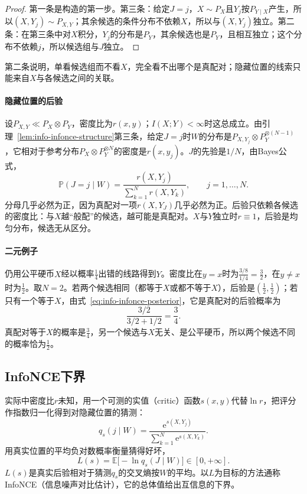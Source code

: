 \begin{proof}
第一条是构造的第一步。第三条：给定$J=j$，$X\sim P_X$且$Y_j$按$P_{Y\mid X}$产生，所以$(X,Y_j)\sim P_{X,Y}$；其余候选的条件分布不依赖$X$，所以与$(X,Y_j)$独立。第二条：在第三条中对$X$积分，$Y_j$的分布是$P_Y$，其余候选也是$P_Y$，且相互独立；这个分布不依赖$j$，所以候选组与$J$独立。
\end{proof}

第二条说明，单看候选组而不看$X$，完全看不出哪个是真配对；隐藏位置的线索只能来自$X$与各候选之间的关联。

\paragraph{隐藏位置的后验}
设$P_{X,Y}\ll P_X\otimes P_Y$，密度比为$r(x,y)$；$I(X;Y)<\infty$时这总成立。由引理~\ref{lem:info-infonce-structure}第三条，给定$J=j$时$W$的分布是$P_{X,Y_j}\otimes P_Y^{\otimes(N-1)}$，它相对于参考分布$P_X\otimes P_Y^{\otimes N}$的密度是$r(x,y_j)$。$J$的先验是$1/N$，由Bayes公式，
\begin{equation}
  \mathbb{P}(J=j\mid W)=\frac{r(X,Y_j)}{\sum_{k=1}^{N}r(X,Y_k)},\qquad j=1,\dots,N.
  \label{eq:info-infonce-posterior}
\end{equation}
分母几乎必然为正，因为真配对一项$r(X,Y_J)$几乎必然为正。后验只依赖各候选的密度比：与$X$越“般配”的候选，越可能是真配对。$X$与$Y$独立时$r\equiv1$，后验是均匀分布，候选无从区分。

\paragraph{二元例子}
仍用公平硬币$X$经以概率$\tfrac14$出错的线路得到$Y$。密度比在$y=x$时为$\tfrac{3/8}{1/4}=\tfrac32$，在$y\neq x$时为$\tfrac12$。取$N=2$。若两个候选相同（都等于$X$或都不等于$X$），后验是$(\tfrac12,\tfrac12)$；若只有一个等于$X$，由式~\eqref{eq:info-infonce-posterior}，它是真配对的后验概率为
\[
  \frac{3/2}{3/2+1/2}=\frac34.
\]
真配对等于$X$的概率是$\tfrac34$，另一个候选与$X$无关、是公平硬币，所以两个候选不同的概率恰为$\tfrac12$。

\subsection{InfoNCE下界}
\label{sec:info-infonce-bound}

实际中密度比$r$未知，用一个可测的实值（critic）函数$s(x,y)$代替$\ln r$，把评分作指数归一化得到对隐藏位置的猜测：
\begin{equation}
  q_s(j\mid W)=\frac{\mathrm{e}^{s(X,Y_j)}}{\sum_{k=1}^{N}\mathrm{e}^{s(X,Y_k)}}.
  \label{eq:info-infonce-softmax}
\end{equation}
用真实位置的平均负对数概率衡量猜得好坏，
\begin{equation}
  L(s)=\mathbb{E}\bigl[-\ln q_s(J\mid W)\bigr]\in[0,+\infty].
  \label{eq:info-infonce-loss}
\end{equation}
$L(s)$是真实后验相对于猜测$q_s$的交叉熵按$W$的平均。以$L$为目标的方法通称InfoNCE（信息噪声对比估计），它的总体值给出互信息的下界。

